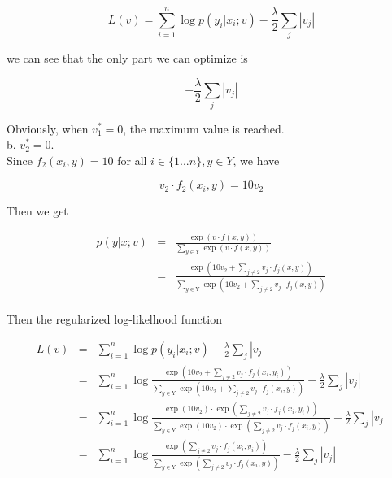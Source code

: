 \documentclass[12pt]{article}
\begin{document}
\begin{equation*}
L(v)= \sum_{i=1}^n {\log {p(y_i|x_i;v)}} - \frac {\lambda}{2} \sum_j
{|v_j|}
\end{equation*}

we can see that the only part we can optimize is

\begin{equation*}
- \frac {\lambda}{2} \sum_j {|v_j|}
\end{equation*}

Obviously, when $v^*_1 = 0$, the maximum value is reached. \\

b. $v^*_2 = 0$. \\

Since $f_2(x_i,y) =10$  for all $i \in \{1...n\}, y \in Y$, we
have

\begin{equation*}
v_2 \cdot f_2(x_i,y) = 10v_2
\end{equation*}

Then we get

\begin{eqnarray*}
p(y|x;v)
&=& \frac {\exp {(v \cdot f(x,y))}}
{\sum_{y \in \mathrm{Y}} {\exp {(v \cdot f(x,y))}}} \\
&=& \frac {\exp {(10v_2 + \sum_{j \neq 2} {v_j \cdot f_j(x,y)})}}
 {\sum_{y \in \mathrm{Y}} {\exp {(10v_2 + \sum_{j \neq 2} {v_j \cdot
         f_j(x,y)})}}} \\
\end{eqnarray*}

Then the regularized log-likelhood function

\begin{eqnarray*}
L(v)
&=& \sum_{i=1}^n {\log {p(y_i|x_i;v)}} - \frac {\lambda}{2} \sum_j
{|v_j|} \\
&=& \sum_{i=1}^n {\log {\frac {\exp {(10v_2 + \sum_{j \neq 2} {v_j \cdot
        f_j(x_i,y_i)})}} {\sum_{y \in \mathrm{Y}} {\exp {(10v_2 + \sum_{j
          \neq 2} {v_j \cdot f_j(x_i,y)})}}}}} - \frac {\lambda}{2}
\sum_j {|v_j|} \\
&=& \sum_{i=1}^n {\log {\frac {\exp {(10v_2)} \cdot \exp {(\sum_{j
          \neq 2} {v_j \cdot f_j(x_i,y_i)})}} {\sum_{y \in \mathrm{Y}}
      {\exp {(10v_2)} \cdot \exp {(\sum_{j \neq 2} {v_j \cdot
            f_j(x_i,y)})}}}}} - \frac {\lambda}{2} \sum_j {|v_j|} \\
&=& \sum_{i=1}^n {\log {\frac {\exp {(\sum_{j \neq 2} {v_j \cdot
          f_j(x_i,y_i)})}} {\sum_{y \in \mathrm{Y}} {\exp {(\sum_{j
            \neq 2} {v_j \cdot f_j(x_i,y)})}}}}} - \frac {\lambda}{2}
\sum_j {|v_j|}
\end{eqnarray*}
\end{document}
